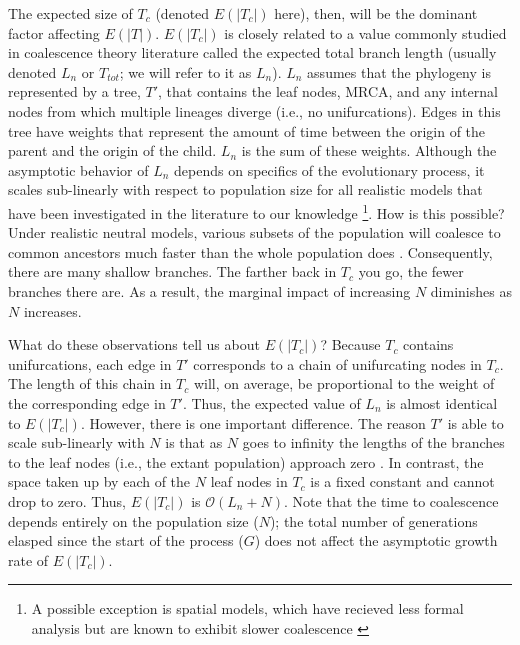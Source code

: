 The expected size of $T_c$ (denoted $E(|T_c|)$ here), then, will be the dominant factor affecting $E(|T|)$.
$E(|T_c|)$ is closely related to a value commonly studied in coalescence theory literature called the expected total branch length (usually denoted $L_n$ or $T_{tot}$; we will refer to it as $L_n$).
$L_n$ assumes that the phylogeny is represented by a tree, $T'$, that contains the leaf nodes, MRCA, and any internal nodes from which multiple lineages diverge (i.e., no unifurcations).
Edges in this tree have weights that represent the amount of time between the origin of the parent and the origin of the child.
$L_n$ is the sum of these weights.
Although the asymptotic behavior of $L_n$ depends on specifics of the evolutionary process, it scales sub-linearly with respect to population size for all realistic models that have been investigated in the literature to our knowledge \citep{gnedinLcoalescentsSurvey2014} \footnote{A possible exception is spatial models, which have recieved less formal analysis but are known to exhibit slower coalescence \citep{berestyckiRecentProgressCoalescent2009}}.  
How is this possible?
Under realistic neutral models, various subsets of the population will coalesce to common ancestors much faster than the whole population does \citep{nordborgCoalescentTheory2019}.
Consequently, there are many shallow branches.
The farther back in $T_c$ you go, the fewer branches there are.
As a result, the marginal impact of increasing $N$ diminishes as $N$ increases.

What do these observations tell us about $E(|T_c|)$?
Because $T_c$ contains unifurcations, each edge in $T'$ corresponds to a chain of unifurcating nodes in $T_c$.
The length of this chain in $T_c$ will, on average, be proportional to the weight of the corresponding edge in $T'$.
Thus, the expected value of $L_n$ is almost identical to $E(|T_c|)$.
However, there is one important difference.
The reason $T'$ is able to scale sub-linearly with $N$ is that as $N$ goes to infinity the lengths of the branches to the leaf nodes (i.e., the extant population) approach zero \citep{nordborgCoalescentTheory2019, delmasAsymptoticResultsLength2008, drmotaAsymptoticResultsConcerning2007}.
In contrast, the space taken up by each of the $N$ leaf nodes in $T_c$ is a fixed constant and cannot drop to zero.
Thus, $E(|T_c|)$ is $\mathcal{O}(L_n + N)$.
Note that the time to coalescence depends entirely on the population size ($N$); the total number of generations elasped since the start of the process ($G$) does not affect the asymptotic growth rate of $E(|T_c|)$.

